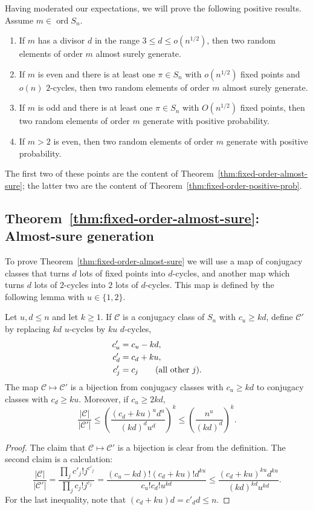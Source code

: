 \documentclass[ALCO,ThmDefs,Unicode,epreuves]{cedram}
\DeclareMathOperator{\ord}{ord}
\newcommand\calC{\mathcal{C}}
\newcommand\ordn{\ord S_n}
\newcommand\br[1]{\left({#1}\right)}
\newcommand\pfrac[2]{\br{\frac{#1}{#2}}}
\begin{document}
Having moderated our expectations, we will prove the following positive results. Assume $m \in \ordn$.
\begin{enumerate}
 \item If $m$ has a divisor $d$ in the range $3 \leq d \leq o(n^{1/2})$, then two random elements of order $m$ almost surely generate.
 \item If $m$ is even and there is at least one $\pi \in S_n$ with $o(n^{1/2})$ fixed points and $o(n)$ $2$-cycles, then two random elements of order $m$ almost surely generate.
 \item If $m$ is odd and there is at least one $\pi \in S_n$ with $O(n^{1/2})$ fixed points, then two random elements of order $m$ generate with positive probability.
 \item If $m > 2$ is even, then two random elements of order $m$ generate with positive probability.
\end{enumerate}
The first two of these points are the content of Theorem~\ref{thm:fixed-order-almost-sure}; the latter two are the content of Theorem~\ref{thm:fixed-order-positive-prob}.

\subsection{Theorem~\ref{thm:fixed-order-almost-sure}: Almost-sure generation}

To prove Theorem~\ref{thm:fixed-order-almost-sure} we will use a map of conjugacy classes that turns $d$ lots of fixed points into $d$-cycles,
and another map which turns $d$ lots of $2$-cycles into $2$ lots of $d$-cycles.
This map is defined by the following lemma with $u \in \{1,2\}$.

\begin{lemma} \label{easy_computation}
Let $u, d \leq n$ and let $k \geq1$. If $\calC$ is a conjugacy class of $S_n$ with $c_u \geq kd$, define $\calC'$ by replacing $kd$ $u$-cycles by $ku$ $d$-cycles, \ie
\begin{align*}
c'_u &= c_u - kd, \\
c'_d &= c_d + ku, \\
c'_j &= c_j \qquad (\textup{all other}~j).
\end{align*}
The map $\calC \mapsto \calC'$ is a bijection from conjugacy classes with $c_u \geq kd$ to conjugacy classes with $c_d \geq ku$.
Moreover, if $c_u \geq 2kd$,
\[
 \frac{|\calC|}{|\calC '|}
 \leq \pfrac{(c_d+ku)^{u} d^{u}}{(kd)^{d} u^{d}}^k
 \leq \pfrac{n^u}{(kd)^d}^k.
\]
\end{lemma}
\begin{proof}
The claim that $\calC \mapsto \calC'$ is a bijection is clear from the definition.
The second claim is a calculation:
\[
 \frac{|\calC|}{|\calC'|}
 = \frac{\prod_j c'_j ! j^{c'_j}}{\prod_j c_j! j^{c_j}}
 = \frac{(c_u - kd)! (c_d+ku)! d^{ku}}{c_u! c_d! u^{kd}}
 \leq \frac{(c_d + ku)^{ku} d^{ku}}{(kd)^{kd} u^{kd}}
 .
\]
For the last inequality, note that $(c_d + ku) d = c'_d d \leq n$.
\end{proof}
\end{document}
